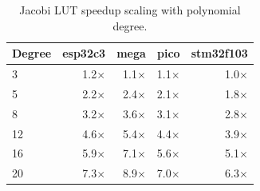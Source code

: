 \begin{table}[t]
\centering
\caption{Jacobi LUT speedup scaling with polynomial degree.}
\label{tab:degree_sweep}
\begin{tabular}{lrrrr}
\toprule
Degree & esp32c3 & mega & pico & stm32f103 \\
\midrule
3 & 1.2$\times$ & 1.1$\times$ & 1.1$\times$ & 1.0$\times$ \\
5 & 2.2$\times$ & 2.4$\times$ & 2.1$\times$ & 1.8$\times$ \\
8 & 3.2$\times$ & 3.6$\times$ & 3.1$\times$ & 2.8$\times$ \\
12 & 4.6$\times$ & 5.4$\times$ & 4.4$\times$ & 3.9$\times$ \\
16 & 5.9$\times$ & 7.1$\times$ & 5.6$\times$ & 5.1$\times$ \\
20 & 7.3$\times$ & 8.9$\times$ & 7.0$\times$ & 6.3$\times$ \\
\bottomrule
\end{tabular}
\end{table}